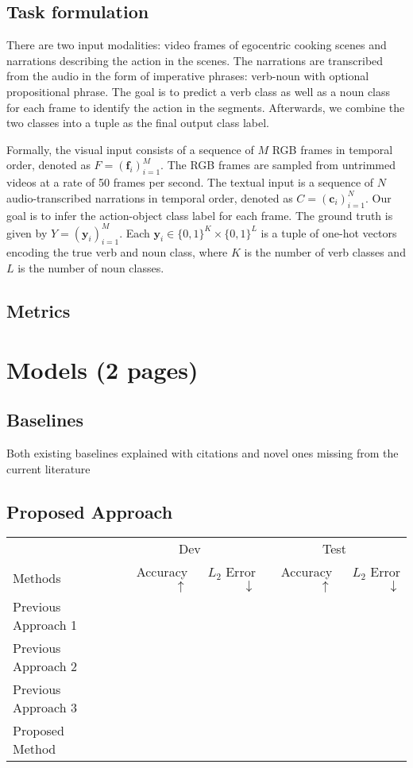 \documentclass[11pt,a4paper]{article}
\begin{document}
\subsection{Task formulation}
There are two input modalities: video frames of egocentric cooking scenes and narrations describing the action in the scenes. The narrations are transcribed from the audio in the form of imperative phrases: verb-noun with optional propositional phrase. The goal is to predict a verb class as well as a noun class for each frame to identify the action in the segments. Afterwards, we combine the two classes into a tuple as the final output class label. 

Formally, the visual input consists of a sequence of $M$ RGB frames in temporal order, denoted as $F=(\mathbf{f}_i)_{i=1}^M$. The RGB frames are sampled from untrimmed videos at a rate of 50 frames per second. The textual input is a sequence of $N$ audio-transcribed narrations in temporal order, denoted as $C=(\mathbf{c}_i)_{i=1}^N$. Our goal is to infer the action-object class label for each frame. The ground truth is given by $Y=(\mathbf{y}_i)_{i=1}^M$. Each $\mathbf{y}_i\in\{0,1\}^K\times\{0,1\}^L$ is a tuple of one-hot vectors encoding the true verb and noun class, where $K$ is the number of verb classes and $L$ is the number of noun classes.





\subsection{Metrics}

\clearpage
\section{Models (2 pages)}

\subsection{Baselines}
Both existing baselines explained with citations and novel ones missing from the current literature

\subsection{Proposed Approach}

\clearpage
\begin{table*}[t]
\centering
\begin{tabular}{lrrrr}
\toprule
                            & \multicolumn{2}{c}{Dev} & \multicolumn{2}{c}{Test}\\
Methods                     & Accuracy $\uparrow$ & $L_2$ Error $\downarrow$ & Accuracy $\uparrow$ & $L_2$ Error $\downarrow$ \\
\midrule
Previous Approach 1 \cite{} & & & & \\
Previous Approach 2 \cite{} & & & & \\
Previous Approach 3 \cite{} & & & & \\
\midrule
Proposed Method             & & & & \\
\bottomrule
\end{tabular}
\end{table*}
\end{document}
